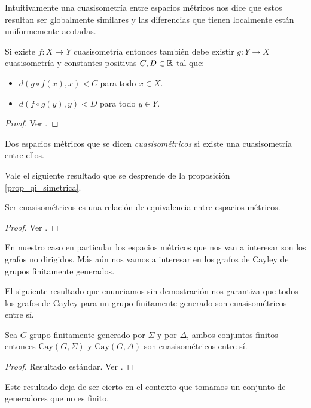 \documentclass[tesis.tex]{subfiles}
\begin{document}
Intuitivamente una cuasisometría entre espacios métricos nos dice que estos resultan ser globalmente similares y las diferencias que tienen localmente están uniformemente acotadas. 
\medskip
\begin{prop}\label{prop_qi_simetrica}
	Si existe $f:X \to Y$ cuasisometría entonces también debe existir $g:Y \to X$ cuasisometría y constantes positivas $C,D \in \mathbb{R}$ tal que:
	\begin{itemize}
		\item $d(g \circ f (x), x) < C$ para todo $x \in X$.
		\item $d(f \circ g (y), y) < D$ para todo $y \in Y$. 
	\end{itemize}
\end{prop}
\begin{proof}
	Ver \cite{loh2017geometric}.
\end{proof}

\begin{deff}
	Dos espacios métricos que se dicen \emph{cuasisométricos} si existe una cuasisometría entre ellos.
\end{deff}

Vale el siguiente resultado que se desprende de la proposición \ref{prop_qi_simetrica}.
\begin{prop}
	Ser cuasisométricos es una relación de equivalencia entre espacios métricos.
\end{prop}
\begin{proof}
	Ver \cite{loh2017geometric}.
\end{proof}

En nuestro caso en particular los espacios métricos que nos van a interesar son los grafos no dirigidos.
Más aún nos vamos a interesar en los grafos de Cayley de grupos finitamente generados.

El siguiente resultado que enunciamos sin demostración nos garantiza que todos los grafos de Cayley para un grupo finitamente generado son cuasisométricos entre sí.
\begin{prop}
	Sea $G$ grupo finitamente generado por $\Sigma$ y por $\Delta$, ambos conjuntos finitos entonces $\text{Cay}(G,\Sigma)$ y $\text{Cay}(G, \Delta)$ son cuasisométricos entre sí.
\end{prop}

\begin{proof}
	Resultado estándar. 
	Ver \cite{bridson2013metric}.
\end{proof}

Este resultado deja de ser cierto en el contexto que tomamos un conjunto de generadores que no es finito.
\end{document}
